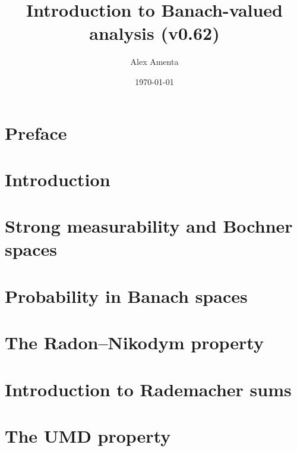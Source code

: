 \documentclass[a4paper,10pt]{amsbook}
\begin{document}
\title[Banach-valued analysis]{Introduction to Banach-valued analysis (v0.62)}
\date{\today}

\author[A. Amenta]{Alex Amenta}
\address{\noindent Mathematisches Institut \newline \indent Universit\"at Bonn, Bonn, Germany}

\maketitle
\tableofcontents


\chapter*{Preface}


\chapter{Introduction}
\label{sec:intro}


\chapter{Strong measurability and Bochner spaces}
\label{sec:Bochner-spaces}


\chapter{Probability in Banach spaces}
\label{sec:martingales} 


\chapter{The Radon--Nikodym property}
\label{sec:RNP}


\chapter{Introduction to Rademacher sums}
\label{sec:rademacher}


\chapter{The UMD property}
\label{sec:UMD}

\end{document}
